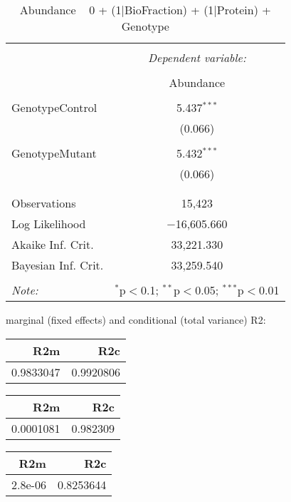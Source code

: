 \documentclass[11pt]{report}
\begin{document}
\begin{table}[!htbp] \centering 
  \caption{Abundance ~ 0 + (1|BioFraction) + (1|Protein) + Genotype} 
  \label{} 
\begin{tabular}{@{\extracolsep{5pt}}lc} 
\\[-1.8ex]\hline 
\hline \\[-1.8ex] 
 & \multicolumn{1}{c}{\textit{Dependent variable:}} \\ 
\cline{2-2} 
\\[-1.8ex] & Abundance \\ 
\hline \\[-1.8ex] 
 GenotypeControl & 5.437$^{***}$ \\ 
  & (0.066) \\ 
  & \\ 
 GenotypeMutant & 5.432$^{***}$ \\ 
  & (0.066) \\ 
  & \\ 
\hline \\[-1.8ex] 
Observations & 15,423 \\ 
Log Likelihood & $-$16,605.660 \\ 
Akaike Inf. Crit. & 33,221.330 \\ 
Bayesian Inf. Crit. & 33,259.540 \\ 
\hline 
\hline \\[-1.8ex] 
\textit{Note:}  & \multicolumn{1}{r}{$^{*}$p$<$0.1; $^{**}$p$<$0.05; $^{***}$p$<$0.01} \\ 
\end{tabular} 
\end{table} 
marginal (fixed effects) and conditional (total variance) R2:

\begin{tabular}{r|r}
\hline
R2m & R2c\\
\hline
0.9833047 & 0.9920806\\
\hline
\end{tabular}

\begin{tabular}{r|r}
\hline
R2m & R2c\\
\hline
0.0001081 & 0.982309\\
\hline
\end{tabular}

\begin{tabular}{r|r}
\hline
R2m & R2c\\
\hline
2.8e-06 & 0.8253644\\
\hline
\end{tabular}
\end{document}
